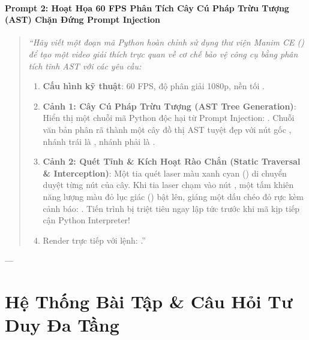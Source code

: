 \begin{simulationbox}
\paragraph{Prompt 2: Hoạt Họa 60 FPS Phân Tích Cây Cú Pháp Trừu Tượng (AST) Chặn Đứng Prompt Injection}
\begin{quote}\small\itshape
``Hãy viết một đoạn mã Python hoàn chỉnh sử dụng thư viện Manim CE () để tạo một video giải thích trực quan về cơ chế bảo vệ công cụ bằng phân tích tĩnh AST với các yêu cầu:
\begin{enumerate}
  \item \textbf{Cấu hình kỹ thuật}: 60 FPS, độ phân giải 1080p, nền tối .
  \item \textbf{Cảnh 1: Cây Cú Pháp Trừu Tượng (AST Tree Generation)}: Hiển thị một chuỗi mã Python độc hại từ Prompt Injection: . Chuỗi văn bản phân rã thành một cây đồ thị AST tuyệt đẹp với nút gốc , nhánh trái là , nhánh phải là .
  \item \textbf{Cảnh 2: Quét Tĩnh \& Kích Hoạt Rào Chắn (Static Traversal \& Interception)}: Một tia quét laser màu xanh cyan () di chuyển duyệt từng nút của cây. Khi tia laser chạm vào nút , một tấm khiên năng lượng màu đỏ lục giác () bật lên, giáng một dấu chéo đỏ rực kèm cảnh báo: . Tiến trình bị triệt tiêu ngay lập tức trước khi mã kịp tiếp cận Python Interpreter!
  \item Render trực tiếp với lệnh: .''
\end{enumerate}
\end{quote}
\end{simulationbox}

---

\section{Hệ Thống Bài Tập \& Câu Hỏi Tư Duy Đa Tầng}
\label{sec:ch09-exercises}

